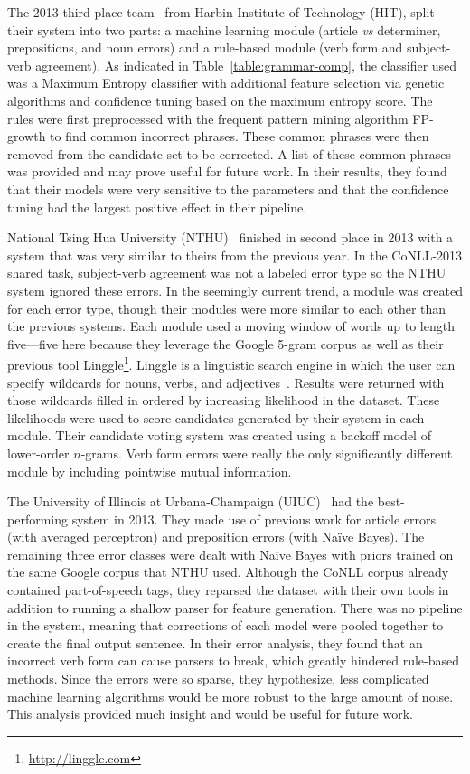 The 2013 third-place team~\cite{2013-task-hit} from Harbin Institute of
Technology (HIT), split their system into two parts: a machine learning module
(article \emph{vs} determiner, prepositions, and noun errors) and a rule-based
module (verb form and subject-verb agreement). As indicated in
Table~\ref{table:grammar-comp}, the classifier used was a Maximum Entropy classifier
with additional feature selection via genetic algorithms and confidence tuning
based on the maximum entropy score. The rules were first preprocessed with the
frequent pattern mining algorithm FP-growth to find common incorrect phrases.
These common phrases were then removed from the candidate set to be corrected. A
list of these common phrases was provided and may prove useful for future work.
In their results, they found that their models were very sensitive to the
parameters and that the confidence tuning had the largest positive effect in
their pipeline.

National Tsing Hua University (NTHU)~\cite{2013-task-nthu} finished in
second place in 2013 with a system that was very similar to theirs from the
previous year. In the CoNLL-2013 shared task, subject-verb agreement was not a
labeled error type so the NTHU system ignored these errors. In the seemingly
current trend, a module was created for each error type, though their modules
were more similar to each other than the previous systems. Each module used a
moving window of words up to length five---five here because they leverage the
Google 5-gram corpus as well as their previous tool
Linggle\footnote{\url{http://linggle.com}}. Linggle is a linguistic search
engine in which the user can specify wildcards for nouns, verbs, and
adjectives~\cite{linggle}. Results were returned with those wildcards filled in
ordered by increasing likelihood in the dataset. These likelihoods were used to
score candidates generated by their system in each module. Their candidate
voting system was created using a backoff model of lower-order $n$-grams. Verb
form errors were really the only significantly different module by including
pointwise mutual information.

The University of Illinois at Urbana-Champaign (UIUC)~\cite{2013-task-uiuc}
had the best-performing system in 2013. They made use of previous work for
article errors (with averaged perceptron) and preposition errors (with Na\"ive
Bayes). The remaining three error classes were dealt with Na\"ive Bayes with
priors trained on the same Google corpus that NTHU used. Although the CoNLL
corpus already contained part-of-speech tags, they reparsed the dataset with
their own tools in addition to running a shallow parser for feature generation.
There was no pipeline in the system, meaning that corrections of each model were
pooled together to create the final output sentence. In their error analysis,
they found that an incorrect verb form can cause parsers to break, which greatly
hindered rule-based methods. Since the errors were so sparse, they hypothesize,
less complicated machine learning algorithms would be more robust to the large
amount of noise. This analysis provided much insight and would be useful for
future work.

